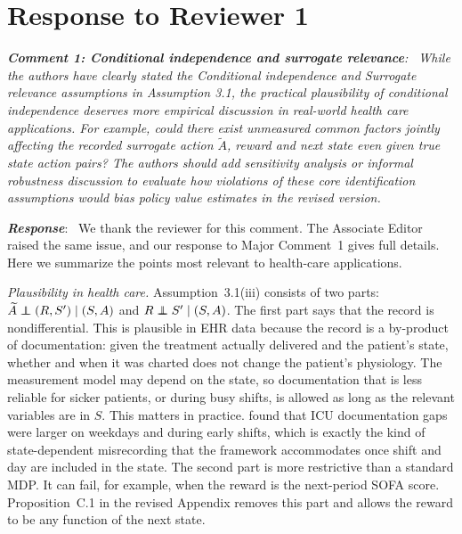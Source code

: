 \documentclass[12pt]{article}
\newcommand\independent{\protect\mathpalette{\protect\independenT}{\perp}}
\def\independenT#1#2{\mathrel{\rlap{$#1#2$}\mkern2mu{#1#2}}}
\newcommand{\0}{\boldsymbol{0}}
\theoremstyle{definition}
\newcommand{\reviewcomment}[1]{\par\begingroup\itshape\noindent\textbf{#1}:\ }
\newcommand{\reviewresponse}{\par\endgroup\noindent\textbf{\textit{Response}}:\ }
\begin{document}
\section*{Response to Reviewer 1}



\reviewcomment{Comment 1: Conditional independence and surrogate relevance} While the authors have clearly stated the Conditional independence and Surrogate relevance assumptions in Assumption 3.1, the practical plausibility of conditional independence deserves more empirical discussion in real-world health care applications. For example, could there exist unmeasured common factors jointly affecting the recorded surrogate action $\widetilde{A}$, reward and next state even given true state action pairs? The authors should add sensitivity analysis or informal robustness discussion to evaluate how violations of these core identification assumptions would bias policy value estimates in the revised version.
\reviewresponse
We thank the reviewer for this comment. The Associate Editor raised the same issue, and our response to Major Comment~1 gives full details. Here we summarize the points most relevant to health-care applications.

\textit{Plausibility in health care.} Assumption~3.1(iii) consists of two parts: $\widetilde A\independent (R,S')\mid (S,A)$ and $R\independent S'\mid (S,A)$. The first part says that the record is nondifferential. This is plausible in EHR data because the record is a by-product of documentation: given the treatment actually delivered and the patient's state, whether and when it was charted does not change the patient's physiology. The measurement model may depend on the state, so documentation that is less reliable for sicker patients, or during busy shifts, is allowed as long as the relevant variables are in $S$. This matters in practice. \citet{raimann2024mind} found that ICU documentation gaps were larger on weekdays and during early shifts, which is exactly the kind of state-dependent misrecording that the framework accommodates once shift and day are included in the state. The second part is more restrictive than a standard MDP. It can fail, for example, when the reward is the next-period SOFA score. Proposition~C.1 in the revised Appendix removes this part and allows the reward to be any function of the next state.
\end{document}
